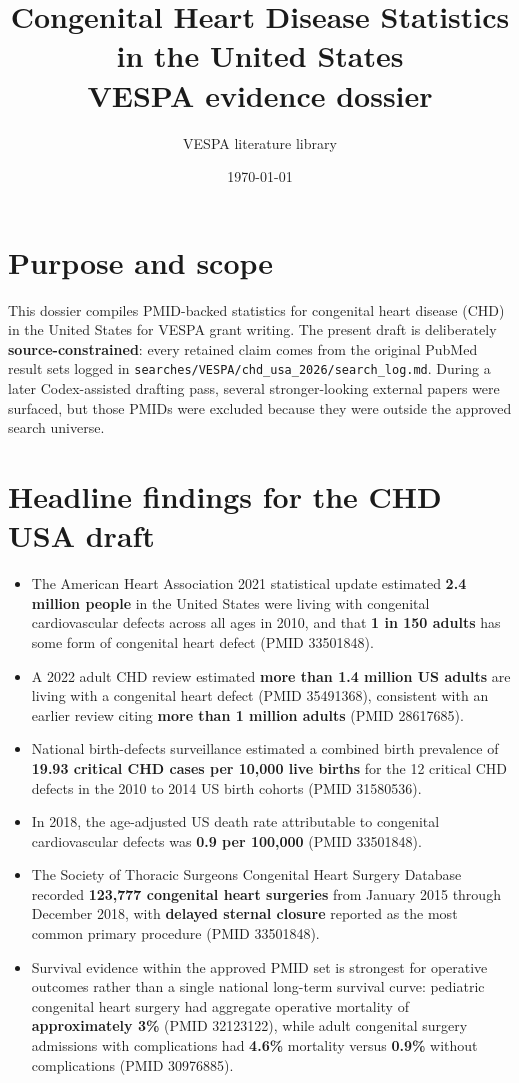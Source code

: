 \documentclass[11pt]{article}
\title{Congenital Heart Disease Statistics in the United States\\VESPA evidence dossier}
\author{VESPA literature library}
\date{\today}
\begin{document}
\maketitle

\section{Purpose and scope}
This dossier compiles PMID-backed statistics for congenital heart disease (CHD) in the United States for VESPA grant writing. The present draft is deliberately \textbf{source-constrained}: every retained claim comes from the original PubMed result sets logged in \texttt{searches/VESPA/chd\_usa\_2026/search\_log.md}. During a later Codex-assisted drafting pass, several stronger-looking external papers were surfaced, but those PMIDs were excluded because they were outside the approved search universe.

\section{Headline findings for the CHD USA draft}
\begin{itemize}[leftmargin=1.5em]
  \item The American Heart Association 2021 statistical update estimated \textbf{2.4 million people} in the United States were living with congenital cardiovascular defects across all ages in 2010, and that \textbf{1 in 150 adults} has some form of congenital heart defect (PMID 33501848).
  \item A 2022 adult CHD review estimated \textbf{more than 1.4 million US adults} are living with a congenital heart defect (PMID 35491368), consistent with an earlier review citing \textbf{more than 1 million adults} (PMID 28617685).
  \item National birth-defects surveillance estimated a combined birth prevalence of \textbf{19.93 critical CHD cases per 10,000 live births} for the 12 critical CHD defects in the 2010 to 2014 US birth cohorts (PMID 31580536).
  \item In 2018, the age-adjusted US death rate attributable to congenital cardiovascular defects was \textbf{0.9 per 100,000} (PMID 33501848).
  \item The Society of Thoracic Surgeons Congenital Heart Surgery Database recorded \textbf{123,777 congenital heart surgeries} from January 2015 through December 2018, with \textbf{delayed sternal closure} reported as the most common primary procedure (PMID 33501848).
  \item Survival evidence within the approved PMID set is strongest for operative outcomes rather than a single national long-term survival curve: pediatric congenital heart surgery had aggregate operative mortality of \textbf{approximately 3\%} (PMID 32123122), while adult congenital surgery admissions with complications had \textbf{4.6\%} mortality versus \textbf{0.9\%} without complications (PMID 30976885).
\end{itemize}
\end{document}
